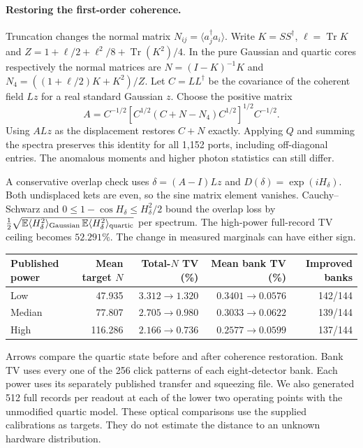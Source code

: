 \documentclass[11pt]{article}
\newcommand{\tr}{\operatorname{Tr}}
\newcommand{\E}{\mathbb{E}}
\begin{document}
\paragraph{Restoring the first-order coherence.}
Truncation changes the normal matrix $N_{ij}=\langle a_j^\dagger a_i\rangle$. Write $K=SS^\dagger$, $\ell=\tr K$ and $Z=1+\ell/2+\ell^2/8+\tr(K^2)/4$. In the pure Gaussian and quartic cores respectively the normal matrices are $N=(I-K)^{-1}K$ and $N_4=((1+\ell/2)K+K^2)/Z$. Let $C=LL^\dagger$ be the covariance of the coherent field $Lz$ for a real standard Gaussian $z$. Choose the positive matrix
\[
 A=C^{-1/2}\left[C^{1/2}(C+N-N_4)C^{1/2}\right]^{1/2}C^{-1/2}.
\]
Using $ALz$ as the displacement restores $C+N$ exactly. Applying $Q$ and summing the spectra preserves this identity for all 1,152 ports, including off-diagonal entries. The anomalous moments and higher photon statistics can still differ.

A conservative overlap check uses $\delta=(A-I)Lz$ and $D(\delta)=\exp(iH_\delta)$. Both undisplaced kets are even, so the sine matrix element vanishes. Cauchy--Schwarz and $0\le1-\cos H_\delta\le H_\delta^2/2$ bound the overlap loss by $\frac12\sqrt{\E\langle H_\delta^2\rangle_{\rm Gaussian}\,\E\langle H_\delta^2\rangle_{\rm quartic}}$ per spectrum. The high-power full-record TV ceiling becomes $52.291\%$. The change in measured marginals can have either sign.

\begin{center}\small
\begin{tabular}{lrrrr}
\toprule
Published power & Mean target $N$ & Total-$N$ TV (\%) & Mean bank TV (\%) & Improved banks\\
\midrule
Low & 47.935 & $3.312\to1.320$ & $0.3401\to0.0576$ & 142/144\\
Median & 77.807 & $2.705\to0.980$ & $0.3033\to0.0622$ & 139/144\\
High & 116.286 & $2.166\to0.736$ & $0.2577\to0.0599$ & 137/144\\
\bottomrule
\end{tabular}
\end{center}
Arrows compare the quartic state before and after coherence restoration. Bank TV uses every one of the 256 click patterns of each eight-detector bank. Each power uses its separately published transfer and squeezing file. We also generated 512 full records per readout at each of the lower two operating points with the unmodified quartic model. These optical comparisons use the supplied calibrations as targets. They do not estimate the distance to an unknown hardware distribution.
\end{document}
